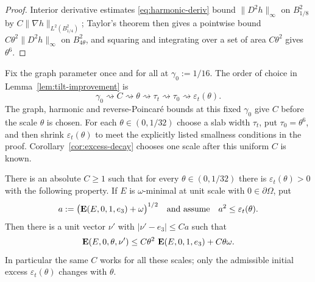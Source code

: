 \begin{proof}
Interior derivative estimates \eqref{eq:harmonic-deriv} bound $\|D^2h\|_\infty$
on $B^2_{1/8}$ by $C\|\nabla h\|_{L^2(B^2_{1/4})}$; Taylor's theorem then gives
a pointwise bound $C\theta^2\|D^2h\|_\infty$ on $B^2_{4\theta}$, and squaring
and integrating over a set of area $C\theta^2$ gives $\theta^6$.
\end{proof}

\begin{constants}\label{const:tilt}
Fix the graph parameter once and for all at $\gamma_0:=1/16$.  The order of
choice in Lemma~\ref{lem:tilt-improvement} is
\[
 \gamma_0\rightsquigarrow C\rightsquigarrow\theta
 \rightsquigarrow\tau_t\rightsquigarrow\tau_0
 \rightsquigarrow\varepsilon_t(\theta).
\]
The graph, harmonic and reverse-Poincar\'e bounds at this fixed $\gamma_0$
give $C$ before the scale $\theta$ is chosen.  For each
$\theta\in(0,1/32)$ choose a slab width $\tau_t$, put $\tau_0=\theta^6$,
and then shrink $\varepsilon_t(\theta)$ to meet the explicitly listed
smallness conditions in the proof.  Corollary~\ref{cor:excess-decay} chooses
one scale after this uniform $C$ is known.
\end{constants}

\begin{lemma}\label{lem:tilt-improvement}
There is an absolute $C\ge1$ such that for every $\theta\in(0,1/32)$ there
is $\varepsilon_t(\theta)>0$ with the following property.  If $E$ is
$\omega$-minimal at unit scale with $0\in\partial\Omega$, put
\begin{equation}\label{eq:tilt-hyp}
  a:=\bigl(\operatorname{\mathbf E}(E,0,1,e_3)+\omega\bigr)^{1/2}
  \quad\text{and assume}\quad a^2\le\varepsilon_t(\theta).
\end{equation}
Then there is a unit vector $\nu'$ with $|\nu'-e_3|\le Ca$ such that
\begin{equation}\label{eq:tilt-improvement}
  \operatorname{\mathbf E}(E,0,\theta,\nu')
  \le C\theta^2\,\operatorname{\mathbf E}(E,0,1,e_3)+C\theta\omega .
\end{equation}
In particular the same $C$ works for all these scales; only the admissible
initial excess $\varepsilon_t(\theta)$ changes with $\theta$.
\end{lemma}

